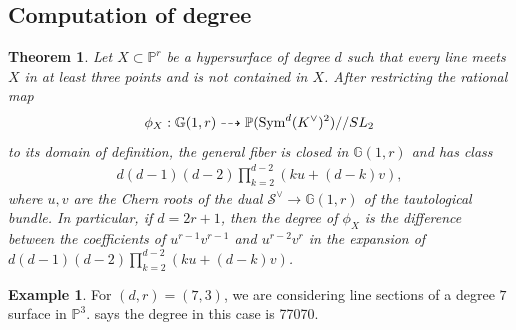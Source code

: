 \documentclass[12pt]{amsart}
\newcommand{\mb}{\mathbb}
\newcommand{\mc}{\mathcal}
\theoremstyle{plain}
\newtheorem{Thm}{Theorem}[section]
\theoremstyle{definition}
\newtheorem{Exam}{Example}
\theoremstyle{remark}
\begin{document}
\subsection{Computation of degree}
\label{APS}
\begin{Thm}
\label{AP}
Let $X\subset\mb{P}^r$ be a hypersurface of degree $d$ such that every line meets $X$ in at least three points and is not contained in $X$. After restricting the rational map
\begin{align*}
\phi_X: \mb{G}(1,r)\dashrightarrow \mb{P}({\rm Sym}^d (K^{\vee})^{2})//SL_{2}
\end{align*}
to its domain of definition, the general fiber is closed in $\mb{G}(1,r)$ and has class 
\begin{align*}
d(d-1)(d-2)\prod_{k=2}^{d-2} (ku+(d-k)v),
\end{align*}
where $u,v$ are the Chern roots of the dual $\mc{S}^{\vee}\to \mb{G}(1,r)$ of the tautological bundle. In particular, if $d=2r+1$, then the degree of $\phi_X$ is the difference between the coefficients of $u^{r-1}v^{r-1}$ and $u^{r-2}v^{r}$ in the expansion of $d(d-1)(d-2)\prod_{k=2}^{d-2} (ku+(d-k)v)$. 
\end{Thm}

\begin{Exam}
For $(d,r)=(7,3)$, we are considering line sections of a degree $7$ surface in $\mb{P}^3$.  says the degree in this case is 77070.  
\end{Exam}

\end{document}
